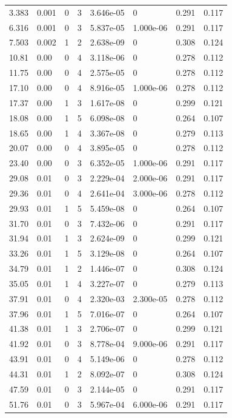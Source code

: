 \documentclass[preview]{standalone}
\begin{document}
{{\begin{tabular}{L{1.2cm}C{1.2cm} C{0.3cm}C{0.5cm} C{1.4cm}C{1.4cm} C{1.4cm}C{1.4cm}}
  3.383  &  0.001  & 0     &  3 &  3.646e-05  & 0  & 0.291 &  0.117   \\ 
  6.316  &  0.001  & 0     &  3 &  5.837e-05  & 1.000e-06  & 0.291 &  0.117   \\ 
  7.503  &  0.002  & 1     &  2 &  2.638e-09  & 0  & 0.308 &  0.124   \\ 
  10.81  &  0.00  & 0     &  4 &  3.118e-06  & 0  & 0.278 &  0.112   \\ 
  11.75  &  0.00  & 0     &  4 &  2.575e-05  & 0  & 0.278 &  0.112   \\ 
  17.10  &  0.00  & 0     &  4 &  8.916e-05  & 1.000e-06  & 0.278 &  0.112   \\ 
  17.37  &  0.00  & 1     &  3 &  1.617e-08  & 0  & 0.299 &  0.121   \\ 
  18.08  &  0.00  & 1     &  5 &  6.098e-08  & 0  & 0.264 &  0.107   \\ 
  18.65  &  0.00  & 1     &  4 &  3.367e-08  & 0  & 0.279 &  0.113   \\ 
  20.07  &  0.00  & 0     &  4 &  3.895e-05  & 0  & 0.278 &  0.112   \\ 
  23.40  &  0.00  & 0     &  3 &  6.352e-05  & 1.000e-06  & 0.291 &  0.117   \\ 
  29.08  &  0.01  & 0     &  3 &  2.229e-04  & 2.000e-06  & 0.291 &  0.117   \\ 
  29.36  &  0.01  & 0     &  4 &  2.641e-04  & 3.000e-06  & 0.278 &  0.112   \\ 
  29.93  &  0.01  & 1     &  5 &  5.459e-08  & 0  & 0.264 &  0.107   \\ 
  31.70  &  0.01  & 0     &  3 &  7.432e-06  & 0  & 0.291 &  0.117   \\ 
  31.94  &  0.01  & 1     &  3 &  2.624e-09  & 0  & 0.299 &  0.121   \\ 
  33.26  &  0.01  & 1     &  5 &  3.129e-08  & 0  & 0.264 &  0.107   \\ 
  34.79  &  0.01  & 1     &  2 &  1.446e-07  & 0  & 0.308 &  0.124   \\ 
  35.05  &  0.01  & 1     &  4 &  3.227e-07  & 0  & 0.279 &  0.113   \\ 
  37.91  &  0.01  & 0     &  4 &  2.320e-03  & 2.300e-05  & 0.278 &  0.112   \\ 
  37.96  &  0.01  & 1     &  5 &  7.016e-07  & 0  & 0.264 &  0.107   \\ 
  41.38  &  0.01  & 1     &  3 &  2.706e-07  & 0  & 0.299 &  0.121   \\ 
  41.92  &  0.01  & 0     &  3 &  8.778e-04  & 9.000e-06  & 0.291 &  0.117   \\ 
  43.91  &  0.01  & 0     &  4 &  5.149e-06  & 0  & 0.278 &  0.112   \\ 
  44.31  &  0.01  & 1     &  2 &  8.092e-07  & 0  & 0.308 &  0.124   \\ 
  47.59  &  0.01  & 0     &  3 &  2.144e-05  & 0  & 0.291 &  0.117   \\ 
  51.76  &  0.01  & 0     &  3 &  5.967e-04  & 6.000e-06  & 0.291 &  0.117   \\ 
\hline 
\end{tabular} 

}}
\end{document}
